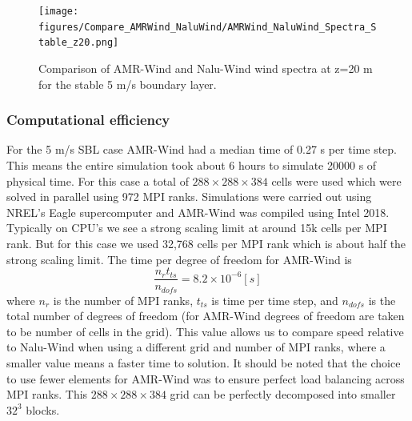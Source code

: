 \begin{figure} %
  \centering
  \texttt{[image: figures/Compare\_AMRWind\_NaluWind/AMRWind\_NaluWind\_Spectra\_Stable\_z20.png]}

  \caption{\label{fig:CompareAMRvsNaluSpectra} Comparison of AMR-Wind
    and Nalu-Wind wind spectra at z=20 m for the stable 5 m/s boundary
    layer. }
\end{figure}




\subsubsection{Computational efficiency}

For the 5 m/s SBL case AMR-Wind had a median time of 0.27 s per time step.
This means the entire simulation took about 6 hours to simulate 20000 s
of physical time. For this case a total of $288\times 288 \times 384$ cells were used
which were solved in parallel using 972 MPI ranks. Simulations were carried out using NREL's
Eagle supercomputer and AMR-Wind was compiled using Intel 2018.
Typically on CPU's we see a strong scaling limit at around 15k cells per MPI rank.
But for this case we used 32,768 cells per MPI rank which is about half the strong scaling limit.
The time per degree of freedom for AMR-Wind is
\[\frac{n_r t_{ts} }{n_{dofs}} = 8.2\times10^{-6} [s]\]
where $n_r$ is the number of MPI ranks, $t_{ts}$ is time per time step, and $n_{dofs}$ is
the total number of degrees of freedom (for AMR-Wind degrees of freedom are taken to be
 number of cells in the grid). This value allows us to compare speed relative to
Nalu-Wind when using a different grid and number of MPI ranks, where a smaller value
means a faster time to solution. It should be noted that the choice to use fewer
elements for AMR-Wind was to ensure perfect load balancing across MPI ranks. This
$288 \times 288 \times 384$ grid can be perfectly decomposed into smaller $32^3$ blocks.

